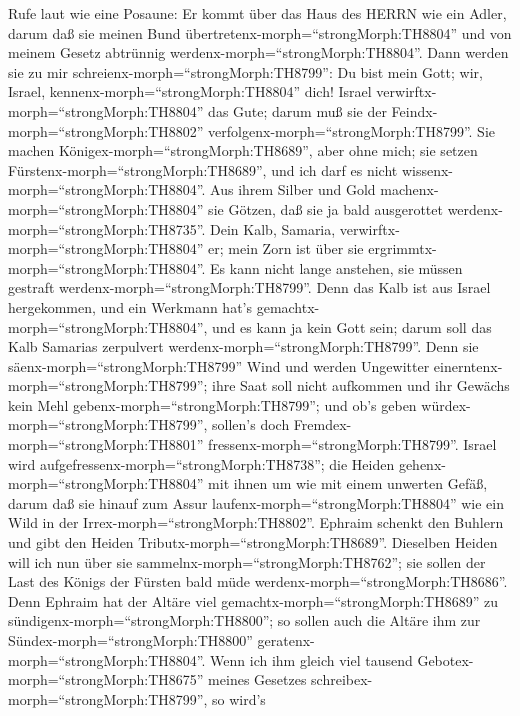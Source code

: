  Rufe laut wie eine Posaune: Er kommt über das Haus des
HERRN wie ein Adler, darum daß sie meinen Bund
übertretenx-morph=``strongMorph:TH8804'' und von meinem Gesetz abtrünnig
werdenx-morph=``strongMorph:TH8804''.  Dann werden sie zu
mir schreienx-morph=``strongMorph:TH8799'': Du bist mein Gott; wir,
Israel, kennenx-morph=``strongMorph:TH8804'' dich!  Israel
verwirftx-morph=``strongMorph:TH8804'' das Gute; darum muß sie der
Feindx-morph=``strongMorph:TH8802''
verfolgenx-morph=``strongMorph:TH8799''.  Sie machen
Königex-morph=``strongMorph:TH8689'', aber ohne mich; sie setzen
Fürstenx-morph=``strongMorph:TH8689'', und ich darf es nicht
wissenx-morph=``strongMorph:TH8804''. Aus ihrem Silber und Gold
machenx-morph=``strongMorph:TH8804'' sie Götzen, daß sie ja bald
ausgerottet werdenx-morph=``strongMorph:TH8735''.  Dein
Kalb, Samaria, verwirftx-morph=``strongMorph:TH8804'' er; mein Zorn ist
über sie ergrimmtx-morph=``strongMorph:TH8804''. Es kann nicht lange
anstehen, sie müssen gestraft werdenx-morph=``strongMorph:TH8799''.
 Denn das Kalb ist aus Israel hergekommen, und ein Werkmann
hat's gemachtx-morph=``strongMorph:TH8804'', und es kann ja kein Gott
sein; darum soll das Kalb Samarias zerpulvert
werdenx-morph=``strongMorph:TH8799''.  Denn sie
säenx-morph=``strongMorph:TH8799'' Wind und werden Ungewitter
einerntenx-morph=``strongMorph:TH8799''; ihre Saat soll nicht aufkommen
und ihr Gewächs kein Mehl gebenx-morph=``strongMorph:TH8799''; und ob's
geben würdex-morph=``strongMorph:TH8799'', sollen's doch
Fremdex-morph=``strongMorph:TH8801''
fressenx-morph=``strongMorph:TH8799''.  Israel wird
aufgefressenx-morph=``strongMorph:TH8738''; die Heiden
gehenx-morph=``strongMorph:TH8804'' mit ihnen um wie mit einem unwerten
Gefäß,  darum daß sie hinauf zum Assur
laufenx-morph=``strongMorph:TH8804'' wie ein Wild in der
Irrex-morph=``strongMorph:TH8802''. Ephraim schenkt den Buhlern und gibt
den Heiden Tributx-morph=``strongMorph:TH8689''.  Dieselben
Heiden will ich nun über sie sammelnx-morph=``strongMorph:TH8762''; sie
sollen der Last des Königs der Fürsten bald müde
werdenx-morph=``strongMorph:TH8686''.  Denn Ephraim hat der
Altäre viel gemachtx-morph=``strongMorph:TH8689'' zu
sündigenx-morph=``strongMorph:TH8800''; so sollen auch die Altäre ihm
zur Sündex-morph=``strongMorph:TH8800''
geratenx-morph=``strongMorph:TH8804''.  Wenn ich ihm gleich
viel tausend Gebotex-morph=``strongMorph:TH8675'' meines Gesetzes
schreibex-morph=``strongMorph:TH8799'', so wird's
